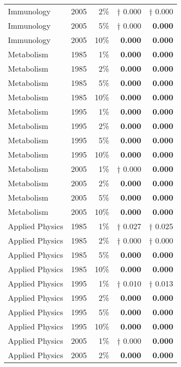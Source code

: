 \documentclass{article}
\begin{document}
\begin{table}
\begin{centering}
{\begin{tabular}{|l crr r|}
Immunology & 2005 & 2\% & $\dagger$ 0.000  & $\dagger$ 0.000  \\ 
Immunology & 2005 & 5\% & $\dagger$ 0.000  & \textbf{0.000} \\ 
Immunology & 2005 & 10\% & \textbf{0.000} & \textbf{0.000} \\
Metabolism & 1985 & 1\% & \textbf{0.000} & \textbf{0.000} \\ 
Metabolism & 1985 & 2\% & \textbf{0.000} & \textbf{0.000} \\ 
Metabolism & 1985 & 5\% & \textbf{0.000} & \textbf{0.000} \\ 
Metabolism & 1985 & 10\% & \textbf{0.000} & \textbf{0.000} \\ 
Metabolism & 1995 & 1\% & \textbf{0.000} & \textbf{0.000} \\ 
Metabolism & 1995 & 2\% & \textbf{0.000} & \textbf{0.000} \\ 
Metabolism & 1995 & 5\% & \textbf{0.000} & \textbf{0.000} \\ 
Metabolism & 1995 & 10\% & \textbf{0.000} & \textbf{0.000} \\ 
Metabolism & 2005 & 1\% & $\dagger$ 0.000  & \textbf{0.000} \\ 
Metabolism & 2005 & 2\% & \textbf{0.000} & \textbf{0.000} \\ 
Metabolism & 2005 & 5\% & \textbf{0.000} & \textbf{0.000} \\ 
Metabolism & 2005 & 10\% & \textbf{0.000} & \textbf{0.000} \\
Applied Physics & 1985 & 1\% & $\dagger$ 0.027  & $\dagger$ 0.025  \\ 
Applied Physics & 1985 & 2\% & $\dagger$ 0.000  & $\dagger$ 0.000  \\ 
Applied Physics & 1985 & 5\% & \textbf{0.000} & \textbf{0.000} \\ 
Applied Physics & 1985 & 10\% & \textbf{0.000} & \textbf{0.000} \\ 
Applied Physics & 1995 & 1\% & $\dagger$ 0.010  & $\dagger$ 0.013  \\ 
Applied Physics & 1995 & 2\% & \textbf{0.000} & \textbf{0.000} \\ 
Applied Physics & 1995 & 5\% & \textbf{0.000} & \textbf{0.000} \\ 
Applied Physics & 1995 & 10\% & \textbf{0.000} & \textbf{0.000} \\ 
Applied Physics & 2005 & 1\% & $\dagger$ 0.000  & \textbf{0.000} \\ 
Applied Physics & 2005 & 2\% & \textbf{0.000} & \textbf{0.000} \\ 

\end{tabular}}
\end{centering}
\end{table}
\end{document}

